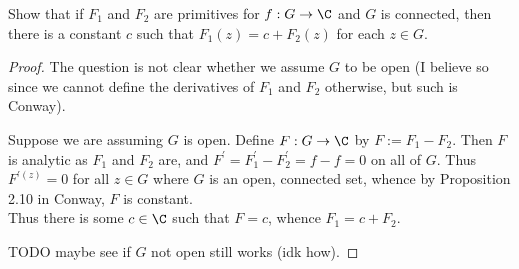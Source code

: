 \documentclass[12pt]{article}
\begin{document}
\begin{homeworkProblem}
  Show that if $ F_{1} $ and $ F_{2} $ are primitives for $ f:G\to \C $ and $ G $ is connected, then there is a constant $ c $ such that $ F_{1}(z) = c+ F_{2}(z) $ for each $ z\in G $.

  \begin{proof}
    The question is not clear whether we assume $ G $ to be open (I believe so since we cannot define the derivatives of $ F_{1} $ and $ F_{2} $ otherwise, but such is Conway).

    Suppose we are assuming $ G $ is open. Define $ F:G\to \C $ by $ F:= F_{1}-F_{2} $. Then $ F $ is analytic as $ F_{1} $ and $ F_{2} $ are, and $ F^{\prime} = F_{1}^{\prime}- F_{2}^{\prime} = f-f = 0 $ on all of $ G $. Thus $ F^{\prime(z)}=0 $ for all $ z\in G $ where $ G $ is an open, connected set, whence by Proposition 2.10 in Conway, $ F $ is constant.\\

      Thus there is some $ c\in \C $ such that $ F = c $, whence $ F_{1}= c+ F_{2} $.

      TODO maybe see if $ G $ not open still works (idk how).
  \end{proof}
\end{homeworkProblem}
\end{document}

